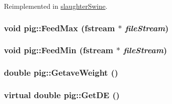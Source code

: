 Reimplemented in \hyperlink{classslaughter_swine_ada8ac1126ab09ff0e2077598b57aedb7}{slaughterSwine}.\hypertarget{classpig_ab80efe296b0c878904a5cc98d7e12b32}{
\subsubsection[{FeedMax}]{\setlength{\rightskip}{0pt plus 5cm}void pig::FeedMax (fstream $\ast$ {\em fileStream})}}
\label{classpig_ab80efe296b0c878904a5cc98d7e12b32}
\hypertarget{classpig_aeb272e66e57b3dbc93ebdef9dbec7916}{
\subsubsection[{FeedMin}]{\setlength{\rightskip}{0pt plus 5cm}void pig::FeedMin (fstream $\ast$ {\em fileStream})}}
\label{classpig_aeb272e66e57b3dbc93ebdef9dbec7916}
\hypertarget{classpig_a27465927a51b581287c7e13e84c1c5c8}{
\subsubsection[{GetaveWeight}]{\setlength{\rightskip}{0pt plus 5cm}double pig::GetaveWeight ()}}
\label{classpig_a27465927a51b581287c7e13e84c1c5c8}
\hypertarget{classpig_aeb56ca7a77c1f27b7bc90ee4df0d4d1f}{
\subsubsection[{GetDE}]{\setlength{\rightskip}{0pt plus 5cm}virtual double pig::GetDE ()}}
\label{classpig_aeb56ca7a77c1f27b7bc90ee4df0d4d1f}


